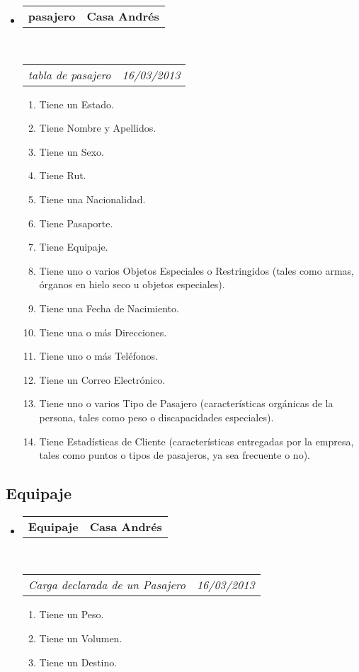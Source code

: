 \documentclass[10pt,letterpaper]{article}
\makeatletter
\newcommand{\headerrow}[2]
{\begin{tabular*}{\linewidth}{l@{\extracolsep{\fill}}r}
	#1 &
	#2 \\
\end{tabular*}}
\makeatother
\begin{document}
\begin{itemize}
	\parskip=0.1em

	\item
	\headerrow
		{\textbf{pasajero}}
		{\textbf{Casa Andrés}}
	\\
	\headerrow
		{\emph{tabla de pasajero}}
		{\emph{16/03/2013}}
	\begin{enumerate}
		\item Tiene un Estado.
		\item Tiene Nombre y Apellidos.
		\item Tiene un Sexo.		
		\item Tiene Rut.
		\item Tiene una Nacionalidad.
		\item Tiene Pasaporte.
		\item Tiene Equipaje.
		\item Tiene uno o varios Objetos Especiales o Restringidos (tales como armas, órganos en hielo seco u objetos especiales).
		\item Tiene una Fecha de Nacimiento.
		\item Tiene una o más Direcciones.
		\item Tiene uno o más Teléfonos.
		\item Tiene un Correo Electrónico.
		\item Tiene uno o varios Tipo de Pasajero (características orgánicas de la persona, tales como peso o discapacidades especiales).
		\item Tiene Estadísticas de Cliente (características entregadas por la empresa, tales como puntos o tipos de pasajeros, ya sea frecuente o no).
		
	\end{enumerate}

\end{itemize}

\subsection*{Equipaje}

\begin{itemize}
	\parskip=0.1em

	\item
	\headerrow
		{\textbf{Equipaje}}
		{\textbf{Casa Andrés}}
	\\
	\headerrow
		{\emph{Carga declarada de un Pasajero}}
		{\emph{16/03/2013}}
	\begin{enumerate}
		\item Tiene un Peso.
		\item Tiene un Volumen.
		\item Tiene un Destino.
	\end{enumerate}

\end{itemize}
\end{document}
